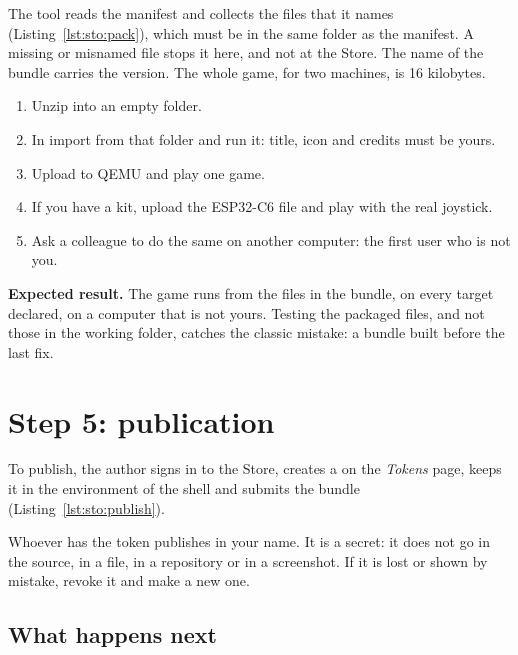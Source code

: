 The tool reads the manifest and collects the files that it names
(Listing~\ref{lst:sto:pack}), which must be in the same folder as the
manifest. A missing or misnamed file stops it here, and not at the Store.
The name of the bundle carries the version. The whole game, for two machines,
is 16 kilobytes.

\begin{prgcheck}
\begin{enumerate}[nosep]
\item Unzip  into an empty folder.
\item In \prgqt import  from that folder and run
  it: title, icon and credits must be yours.
\item Upload  to QEMU and play one game.
\item If you have a kit, upload the ESP32-C6 file and play with the real
  joystick.
\item Ask a colleague to do the same on another computer: the first user who
  is not you.
\end{enumerate}
\textbf{Expected result.} The game runs from the files in the bundle, on
every target declared, on a computer that is not yours. Testing the packaged
files, and not those in the working folder, catches the classic mistake: a
bundle built before the last fix.
\end{prgcheck}

\section{Step 5: publication}


To publish, the author signs in to the Store, creates a  on the
\emph{Tokens} page, keeps it in the environment of the shell and submits the
bundle (Listing~\ref{lst:sto:publish}).

\begin{prgwarn}
Whoever has the token publishes in your name. It is a secret: it does not go
in the source, in a file, in a repository or in a screenshot. If it is lost
or shown by mistake, revoke it and make a new one.
\end{prgwarn}

\subsection{What happens next}

